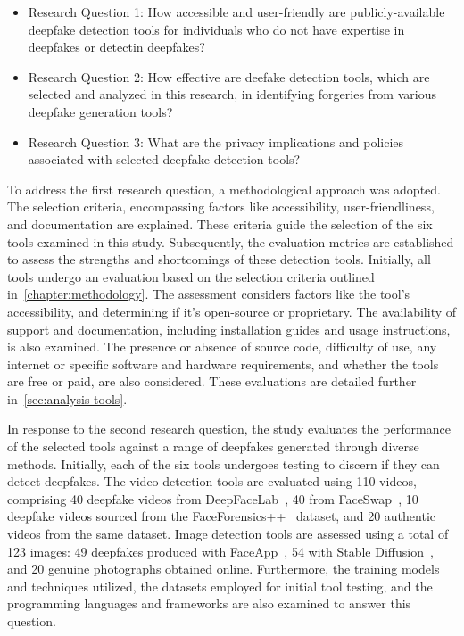 \begin{itemize}
	\item Research Question 1: How accessible and user-friendly are publicly-available
	      deepfake detection tools for individuals who do not have expertise in deepfakes or
	      detectin deepfakes?
	\item Research Question 2: How effective are deefake detection tools, which are selected
	      and analyzed in this research, in identifying forgeries from various deepfake
	      generation tools?
	\item Research Question 3: What are the privacy implications and policies associated with
	      selected deepfake detection tools?
\end{itemize}

To address the first research question, a methodological approach was adopted. The selection
criteria, encompassing factors like accessibility, user-friendliness, and documentation
are explained. These criteria guide the selection of the six tools examined in this study.
Subsequently, the evaluation metrics are established to assess the strengths and shortcomings
of these detection tools. Initially, all tools undergo an evaluation based on the selection
criteria outlined in~\autoref{chapter:methodology}. The assessment considers factors like
the tool's accessibility, and determining if it's open-source or proprietary. The availability
of support and documentation, including installation guides and usage instructions, is also
examined. The presence or absence of source code, difficulty of use, any internet or
specific software and hardware requirements, and whether the tools are free or paid,
are also considered. These evaluations are detailed further in~\autoref{sec:analysis-tools}.

In response to the second research question, the study evaluates the performance of the
selected tools against a range of deepfakes generated through diverse methods. Initially,
each of the six tools undergoes testing to discern if they can detect deepfakes. The video
detection tools are evaluated using 110 videos, comprising 40 deepfake videos from
DeepFaceLab~\cite{perov2021deepfacelab}, 40 from FaceSwap~\cite{faceswap}, 10 deepfake
videos sourced from the FaceForensics++~\cite{roessler2019faceforensicspp} dataset,
and 20 authentic videos from the same dataset. Image detection tools are assessed using a
total of 123 images: 49 deepfakes produced with FaceApp~\cite{faceapp-app},
54 with Stable Diffusion~\cite{stable-diffusion}, and 20 genuine photographs obtained online.
Furthermore, the training models and techniques utilized, the datasets employed for initial tool
testing, and the programming languages and frameworks are also examined to answer this question.

